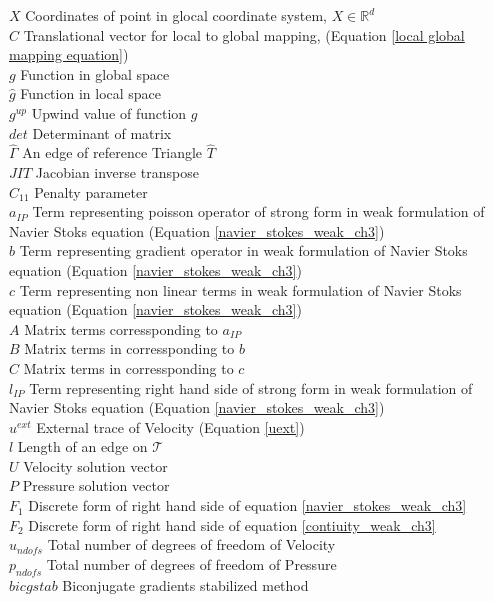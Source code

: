 \documentclass[a4paper,12pt]{book}
\begin{document}
$X$ Coordinates of point in glocal coordinate system, $X \in \mathbb{R}^d$ \\
$C$ Translational vector for local to global mapping, (Equation \ref{local global mapping equation})\\
$g$ Function in global space \\
$\hat{g}$ Function in local space \\
$g^{up}$ Upwind value of function $g$\\
$det$ Determinant of matrix \\
$\hat{\Gamma}$ An edge of reference Triangle $\hat{T}$\\
$JIT$ Jacobian inverse transpose\\
$C_{11}$ Penalty parameter \\
$a_{IP}$ Term representing poisson operator of strong form in weak formulation of Navier Stoks equation (Equation \eqref{navier_stokes_weak_ch3}) \\
$b$ Term representing gradient operator in weak formulation of Navier Stoks equation (Equation \eqref{navier_stokes_weak_ch3}) \\
$c$ Term representing non linear terms in weak formulation of Navier Stoks equation (Equation \eqref{navier_stokes_weak_ch3}) \\
$A$ Matrix terms corressponding to $a_{IP}$\\
$B$ Matrix terms in corressponding to $b$\\
$C$ Matrix terms in corressponding to $c$\\
$l_{IP}$ Term representing right hand side of strong form in weak formulation of Navier Stoks equation (Equation \eqref{navier_stokes_weak_ch3}) \\
$u^{ext}$ External trace of Velocity (Equation \ref{uext})\\
$l$ Length of an edge on $\mathcal{T}$\\
$U$ Velocity solution vector \\
$P$ Pressure solution vector\\
$F_1$ Discrete form of right hand side of equation \eqref{navier_stokes_weak_ch3}\\
$F_2$ Discrete form of right hand side of equation \eqref{contiuity_weak_ch3}\\
$u_{ndofs}$ Total number of degrees of freedom of Velocity\\
$p_{ndofs}$ Total number of degrees of freedom of Pressure\\
$bicgstab$ Biconjugate gradients stabilized method\\
\end{document}
